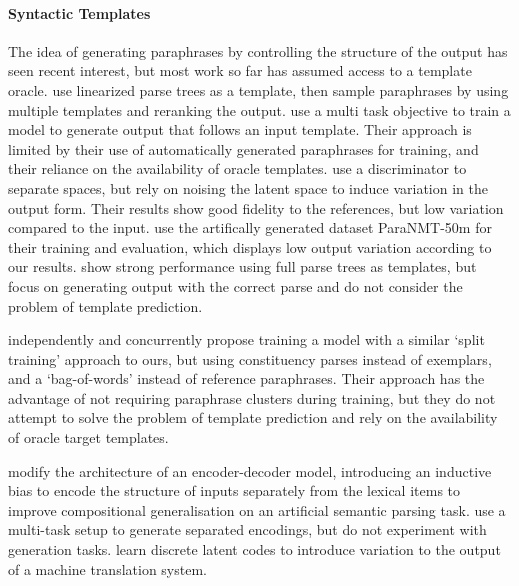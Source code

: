 \documentclass[11pt,a4paper]{article}
\begin{document}
\paragraph{Syntactic Templates}

The idea of generating paraphrases by controlling the structure of the output has seen recent interest, but most work so far has assumed access to a template oracle. \citet{iyyer-etal-2018-adversarial} use linearized parse trees as a template, then sample paraphrases by using multiple templates and reranking the output. \citet{chen-etal-2019-controllable} use a multi task objective to train a model to generate output that follows an input template. Their approach is limited by their use of automatically generated paraphrases for training, and their reliance on the availability of oracle templates. \citet{bao-etal-2019-generating} use a discriminator to separate spaces, but rely on noising the latent space to induce variation in the output form. Their results show good fidelity to the references, but low variation compared to the input. \citet{goyal_neural_2020} use the artifically generated dataset ParaNMT-50m \cite{wieting-gimpel-2018-paranmt} for their training and evaluation, which displays low output variation according to our results. \citet{sgcp2020} show strong performance using full parse trees as templates, but focus on generating output with the correct parse and do not consider the problem of template prediction.

\citet{synpg} independently and concurrently propose training a model with a similar `split training' approach to ours, but using constituency parses instead of exemplars, and a `bag-of-words' instead of reference paraphrases. Their approach has the advantage of not requiring paraphrase clusters during training, but they do not attempt to solve the problem of template prediction and rely on the availability of oracle target templates.

\citet{russin-etal-2020-compositional} modify the architecture of an
encoder-decoder model, introducing an inductive bias to encode the
structure of inputs separately from the lexical items to improve
compositional generalisation on an artificial semantic parsing task. \citet{chen-etal-2019-multi} use a multi-task setup to generate separated encodings, but do not experiment with generation tasks. \citet{shu-etal-2019-generating} learn discrete latent codes to introduce variation to the output of a machine translation system.
\end{document}
